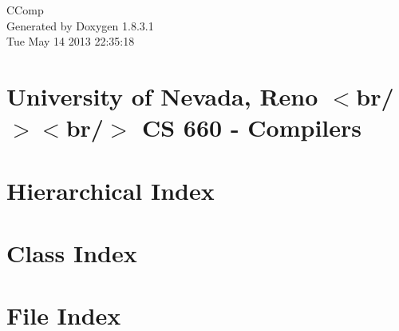 \documentclass{book}
\begin{document}
\hypersetup{pageanchor=false,citecolor=blue}
\begin{titlepage}
\vspace*{7cm}
\begin{center}
{\Large C\-Comp }\\
\vspace*{1cm}
{\large Generated by Doxygen 1.8.3.1}\\
\vspace*{0.5cm}
{\small Tue May 14 2013 22:35:18}\\
\end{center}
\end{titlepage}
\clearemptydoublepage
{}
\tableofcontents
\clearemptydoublepage
{}
\hypersetup{pageanchor=true,citecolor=blue}
\chapter{University of Nevada, Reno $<$br/$>$$<$br/$>$ C\-S 660 -\/ Compilers}
\label{index}\hypertarget{index}{}
\chapter{Hierarchical Index}

\chapter{Class Index}

\chapter{File Index}

\end{document}
